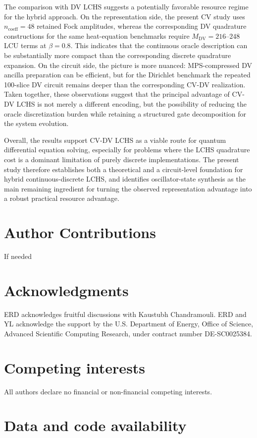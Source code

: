 \documentclass{article}
\begin{document}
The comparison with DV LCHS suggests a potentially favorable resource regime for the hybrid approach. On the representation side, the present CV study uses $n_{\mathrm{coeff}}=48$ retained Fock amplitudes, whereas the corresponding DV quadrature constructions for the same heat-equation benchmarks require $M_{\mathrm{DV}}=216$--$248$ LCU terms at $\beta=0.8$. This indicates that the continuous oracle description can be substantially more compact than the corresponding discrete quadrature expansion. On the circuit side, the picture is more nuanced: MPS-compressed DV ancilla preparation can be efficient, but for the Dirichlet benchmark the repeated 100-slice DV circuit remains deeper than the corresponding CV-DV realization. Taken together, these observations suggest that the principal advantage of CV-DV LCHS is not merely a different encoding, but the possibility of reducing the oracle discretization burden while retaining a structured gate decomposition for the system evolution.

Overall, the results support CV-DV LCHS as a viable route for quantum differential equation solving, especially for problems where the LCHS quadrature cost is a dominant limitation of purely discrete implementations. The present study therefore establishes both a theoretical and a circuit-level foundation for hybrid continuous-discrete LCHS, and identifies oscillator-state synthesis as the main remaining ingredient for turning the observed representation advantage into a robust practical resource advantage.





\section{Author Contributions}
If needed


\section{Acknowledgments}

ERD acknowledges fruitful discussions with Kaustubh Chandramouli. ERD and YL acknowledge the support by the U.S. Department of Energy, Office of Science, Advanced Scientific Computing Research, under contract number DE-SC0025384. 


\section{Competing interests}
All authors declare no financial or non-financial competing interests. 




\section{Data and code availability}









\appendix

\end{document}

